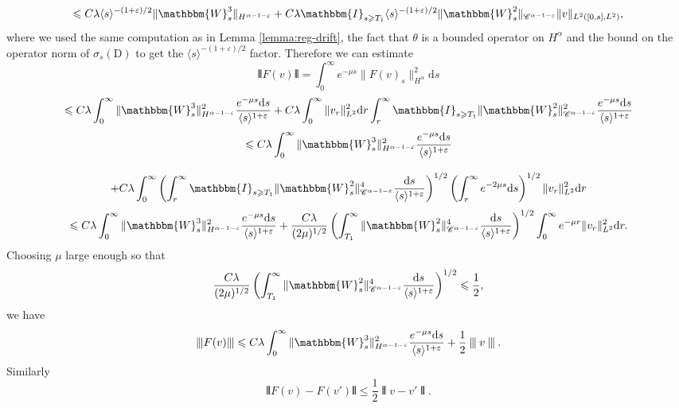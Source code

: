 \documentclass[11pt, oneside]{article}   	%
\newcommand{\mathD}{\mathrm{D}}
\newcommand{\mathd}{\mathrm{d}}
\newcommand{\VV}{\mathscr{C}}
\begin{document}
\[ \leqslant C \lambda \langle s \rangle^{- (1 + \varepsilon) / 2} \|
   \mathbbm{W}_s^3 \|_{H^{\alpha - 1 - \varepsilon}} + C \lambda
   \mathbbm{I}_{s \geqslant T_1} \langle s \rangle^{- (1 + \varepsilon) / 2}
   \| \mathbbm{W}^2_s \|_{\VV^{\alpha - 1 - \varepsilon}} \| v \|_{L^2 ([0,
   s], L^2)}, \]
where we used the same computation as in Lemma \ref{lemma:reg-drift}, the fact
that $\theta$ is a bounded operator on $H^{\alpha}$ and the bound on the
operator norm of $\sigma_s (\mathD)$ to get the $\langle s \rangle^{- (1 +
\varepsilon) / 2}$ factor. Therefore we can estimate
\[ \interleave F (v) \interleave = \int_0^{\infty} e^{- \mu s} \| F (v)_s
   \|_{H^{\alpha}}^2 \mathd s \]
\[ \leqslant C \lambda \int_0^{\infty} \| \mathbbm{W}_s^3 \|_{H^{\alpha - 1 -
   \varepsilon}}^2 \frac{e^{- \mu s} \mathd s}{\langle s \rangle^{1 +
   \varepsilon}} + C \lambda \int_0^{\infty} \| v_r \|_{L^2}^2 \mathd r
   \int_r^{\infty} \mathbbm{I}_{s \geqslant T_1} \| \mathbbm{W}^2_s
   \|_{\VV^{\alpha - 1 - \varepsilon}}^2 \frac{e^{- \mu s} \mathd s}{\langle s
   \rangle^{1 + \varepsilon}} \]
\[ \leqslant C \lambda \int_0^{\infty} \| \mathbbm{W}_s^3 \|_{H^{\alpha - 1 -
   \varepsilon}}^2 \frac{e^{- \mu s} \mathd s}{\langle s \rangle^{1 +
   \varepsilon}} \]
\[ \  \]
\[ + C \lambda \int_0^{\infty} \left( \int_r^{\infty} \mathbbm{I}_{s \geqslant
   T_1} \| \mathbbm{W}^2_s \|_{\VV^{\alpha - 1 - \varepsilon}}^4 \frac{\mathd
   s}{\langle s \rangle^{1 + \varepsilon}} \right)^{1 / 2} \left(
   \int_r^{\infty} e^{- 2 \mu s} \mathd s \right)^{1 / 2} \| v_r \|_{L^2}^2
   \mathd r \]
\[ \leqslant C \lambda \int_0^{\infty} \| \mathbbm{W}_s^3 \|_{H^{\alpha - 1 -
   \varepsilon}}^2 \frac{e^{- \mu s} \mathd s}{\langle s \rangle^{1 +
   \varepsilon}} + \frac{C \lambda}{(2 \mu)^{1 / 2}} \left(
   \int_{T_1}^{\infty} \| \mathbbm{W}^2_s \|_{\VV^{\alpha - 1 -
   \varepsilon}}^4 \frac{\mathd s}{\langle s \rangle^{1 + \varepsilon}}
   \right)^{1 / 2} \int_0^{\infty} e^{- \mu r} \| v_r \|_{L^2}^2 \mathd r . \]
\[ \  \]
Choosing $\mu$ large enough so that
\[ \frac{C \lambda}{(2 \mu)^{1 / 2}} \left( \int_{T_1}^{\infty} \|
   \mathbbm{W}^2_s \|_{\VV^{\alpha - 1 - \varepsilon}}^4 \frac{\mathd
   s}{\langle s \rangle^{1 + \varepsilon}} \right)^{1 / 2} \leqslant
   \frac{1}{2}, \]
we have
\[ \interleave F (v) \interleave \leqslant C \lambda \int_0^{\infty} \|
   \mathbbm{W}_s^3 \|_{H^{\alpha - 1 - \varepsilon}}^2 \frac{e^{- \mu s}
   \mathd s}{\langle s \rangle^{1 + \varepsilon}} + \frac{1}{2} \interleave v
   \interleave . \]
Similarly
\[ \interleave F (v) - F (v') \interleave \leqslant \frac{1}{2} \interleave v
   - v' \interleave . \]
\end{document}
